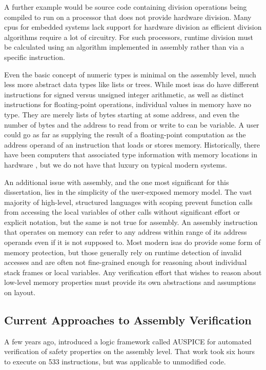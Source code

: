 A further example would be source code containing division operations
being compiled to run on a processor that does not provide hardware division.
Many \acp{cpu} for embedded systems lack support for hardware division
as efficient division algorithms require a lot of circuitry.
For such processors, runtime division must be calculated using an algorithm
implemented in assembly rather than via a specific instruction.

Even the basic concept of numeric types is minimal on the assembly level,
much less more abstract data types like lists or trees.
While most \acp{isa} do have different instructions
for signed versus unsigned integer arithmetic,
as well as distinct instructions for floating-point operations,
individual values in memory have no type.
They are merely lists of bytes starting at some address,
and even the number of bytes and the address to read from or write to can be variable.
A user could go as far as supplying the result of a floating-point computation
as the address operand of an instruction that loads or stores memory.
Historically, there have been computers that associated type information
with memory locations in hardware \autocite{feustel1972rice,feustel1973advantages,thornton2008rice},
but we do not have that luxury on typical modern systems.

An additional issue with assembly,
and the one most significant for this dissertation,
lies in the simplicity of the user-exposed memory model.
The vast majority of high-level, structured languages with scoping
prevent function calls from accessing the local variables of other calls
without significant effort or explicit notation, but the same is not true for assembly.
An assembly instruction that operates on memory can refer to any
address within range of its address operands even if it is not supposed to.
Most modern \acp{isa} do provide some form of memory protection,
but those generally rely on runtime detection of invalid accesses
and are often not fine-grained enough for reasoning about individual stack frames
or local variables.
Any verification effort that wishes to reason about low-level memory properties
must provide its own abstractions and assumptions on layout.

\subsection{Current Approaches to Assembly Verification}
A few years ago, \textcite{tan2015auspice} introduced a logic framework called AUSPICE
for automated verification of safety properties on the assembly level.
That work took six hours to execute on \num{533} instructions,
but was applicable to unmodified code.

